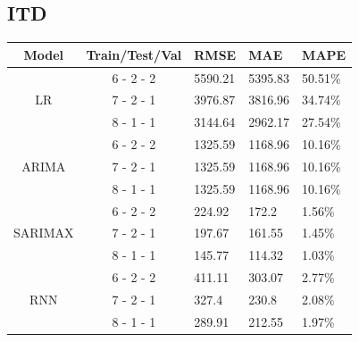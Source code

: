\documentclass{ieeeojies}
\begin{document}
\subsection{ITD}
\begin{table}[H]
    \renewcommand{\arraystretch}{1.5}
    \centering
    \begin{tabular}{|c|c|p{1cm}|p{1cm}|p{1cm}|}
        \hline
        \textbf{Model} & \textbf{Train/Test/Val} & \textbf{RMSE} & \textbf{MAE} & \textbf{MAPE} \\
        \hline
        \multirow{3}{*}{LR}
                       & 6 - 2 - 2               & 5590.21       & 5395.83      & 50.51\%       \\
        \cline{2-5}
                       & 7 - 2 - 1               & 3976.87       & 3816.96      & 34.74\%       \\
        \cline{2-5}
                       & 8 - 1 - 1               & 3144.64       & 2962.17      & 27.54\%       \\
        \hline
        \multirow{3}{*}{ARIMA}
                       & 6 - 2 - 2               & 1325.59       & 1168.96      & 10.16\%       \\
        \cline{2-5}
                       & 7 - 2 - 1               & 1325.59       & 1168.96      & 10.16\%       \\
        \cline{2-5}
                       & 8 - 1 - 1               & 1325.59       & 1168.96      & 10.16\%       \\
        \hline
        \multirow{3}{*}{SARIMAX}
                       & 6 - 2 - 2               & 224.92        & 172.2        & 1.56\%        \\
        \cline{2-5}
                       & 7 - 2 - 1               & 197.67        & 161.55       & 1.45\%        \\
        \cline{2-5}
                       & 8 - 1 - 1               & 145.77        & 114.32       & 1.03\%        \\
        \hline
        \multirow{3}{*}{RNN}
                       & 6 - 2 - 2               & 411.11        & 303.07       & 2.77\%        \\
        \cline{2-5}
                       & 7 - 2 - 1               & 327.4         & 230.8        & 2.08\%        \\
        \cline{2-5}
                       & 8 - 1 - 1               & 289.91        & 212.55       & 1.97\%        \\

\end{tabular}
\end{table}
\end{document}
